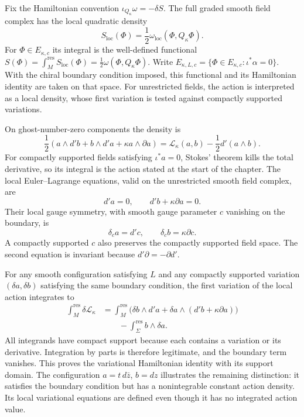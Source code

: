Fix the Hamiltonian convention $\iota_{Q_\kappa}\omega=-\delta S$.
The full graded smooth field complex has the local quadratic density
\[
 S_{\mathrm{loc}}(\Phi)
       =\frac12\omega_{\mathrm{loc}}(\Phi,Q_\kappa\Phi).
\]
For $\Phi\in E_{\kappa,c}$ its integral is the well-defined functional
$S(\Phi)=\int_M^{\mathrm{res}}S_{\mathrm{loc}}(\Phi)
=\frac12\omega(\Phi,Q_\kappa\Phi)$.
Write $E_{\kappa,L,c}=\{\Phi\in E_{\kappa,c}:\iota^*\alpha=0\}$.
With the chiral boundary condition imposed, this functional and its
Hamiltonian identity are taken on that space.
For unrestricted fields, the action is interpreted as a local
density, whose first variation is tested against compactly supported
variations.

On ghost-number-zero components the density is
\[
 \frac12(a\wedge d'b+b\wedge d'a+\kappa a\wedge\partial a)
 =\mathcal L_\kappa(a,b)-\frac12d'(a\wedge b).
\]
For compactly supported fields satisfying $\iota^*a=0$, Stokes'
theorem kills the total derivative, so its integral is the action
stated at the start of the chapter.  The local Euler--Lagrange
equations, valid on the unrestricted smooth field complex, are
\[
 d'a=0,\qquad d'b+\kappa\partial a=0.
\]
Their local gauge symmetry, with smooth gauge parameter $c$ vanishing
on the boundary, is
\[
 \delta_c a=d'c,\qquad \delta_c b=\kappa\partial c.
\]
A compactly supported $c$ also preserves the compactly supported
field space.  The second equation is invariant because
$d'\partial=-\partial d'$.

For any smooth configuration satisfying $L$ and any compactly
supported variation $(\delta a,\delta b)$ satisfying the same boundary
condition, the first variation of the local action integrates to
\[
 \begin{split}
 \int_M^{\mathrm{res}}\delta\mathcal L_\kappa
 &=\int_M^{\mathrm{res}}
       \bigl(\delta b\wedge d'a
              +\delta a\wedge(d'b+\kappa\partial a)\bigr)\\
 &\qquad-\int_\Sigma^{\mathrm{res}}b\wedge\delta a.
 \end{split}
\]
All integrands have compact support because each contains a variation
or its derivative.  Integration by parts is therefore legitimate,
and the boundary term vanishes.  This proves the variational
Hamiltonian identity with its support domain.  The configuration
$a=t\,d\bar z$, $b=dz$ illustrates the remaining distinction: it
satisfies the boundary condition but has a nonintegrable constant
action density.  Its local variational equations are defined even
though it has no integrated action value.


